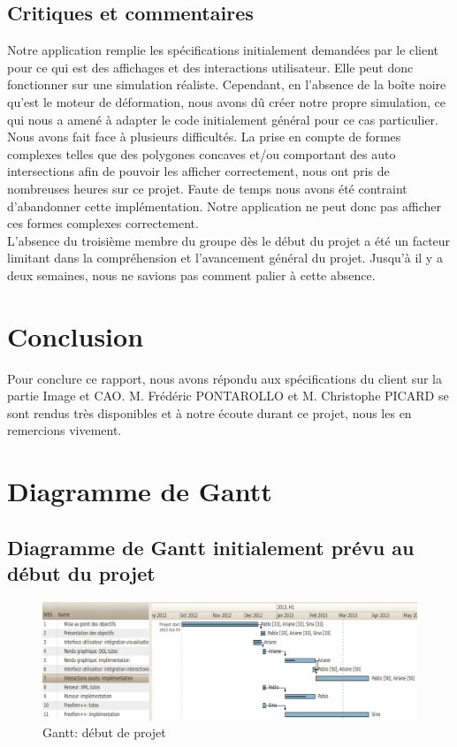 \documentclass[a4paper, 11pt]{article}
\begin{document}
\subsection{Critiques et commentaires}
Notre application remplie les spécifications initialement demandées par le client pour ce qui est des affichages et des interactions utilisateur.
Elle peut donc fonctionner sur une simulation réaliste.
Cependant, en l'absence de la boîte noire qu'est le moteur de déformation, nous avons dû créer notre propre simulation, ce qui nous a amené à adapter le code initialement général pour ce cas particulier.\\
Nous avons fait face à plusieurs difficultés.
La prise en compte de formes complexes telles que des polygones concaves et/ou comportant des auto intersections afin de pouvoir les afficher correctement, nous ont pris de nombreuses heures sur ce projet.
Faute de temps nous avons été contraint d'abandonner cette implémentation.
Notre application ne peut donc pas afficher ces formes complexes correctement.\\
L'absence du troisième membre du groupe dès le début du projet a été un facteur limitant dans la compréhension et l'avancement général du projet.
Jusqu'à il y a deux semaines, nous ne savions pas comment palier à cette absence.\\

\section{Conclusion}
Pour conclure ce rapport, nous avons répondu aux spécifications du client sur la partie Image et CAO.
M. Frédéric PONTAROLLO et M. Christophe PICARD se sont rendus très disponibles et à notre écoute durant ce projet, nous les en remercions vivement.

\section{Diagramme de Gantt}
\subsection{Diagramme de Gantt initialement prévu au début du projet}
\begin{figure}[H]
    \includegraphics[width=\textwidth]{img/gantt.png}
    \caption{Gantt: début de projet}
\end{figure}
\end{document}
